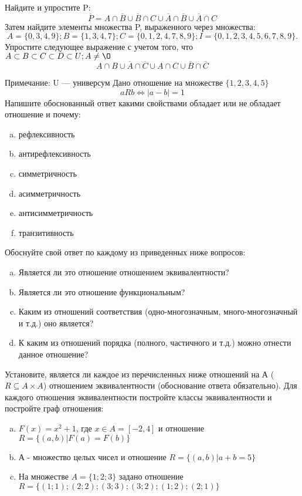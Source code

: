 \documentclass[10pt]{exam}
\begin{document}
\begin{questions}
\question
Найдите и упростите P:
\begin{equation*}
\overline{P} = A \cap \overline{B} \cup \overline{B} \cap C \cup \overline{A} \cap \overline{B} \cup \overline{A} \cap C
\end{equation*}
Затем найдите элементы множества P, выраженного через множества:
\begin{equation*}
A = \{0, 3, 4, 9\}; 
B = \{1, 3, 4, 7\};
C = \{0, 1, 2, 4, 7, 8, 9\};
I = \{0, 1, 2, 3, 4, 5, 6, 7, 8, 9\}.
\end{equation*}\question
Упростите следующее выражение с учетом того, что $A\subset B \subset C \subset D \subset U; A \neq \O$
\begin{equation*}
A \cap B \cup \overline{A} \cap \overline{C} \cup A \cap C \cup \overline{B} \cap \overline{C}
\end{equation*}

Примечание: U — универсум\question
Дано отношение на множестве $\{1, 2, 3, 4, 5\}$ 
\begin{equation*}
aRb \iff |a-b| = 1
\end{equation*}
Напишите обоснованный ответ какими свойствами обладает или не обладает отношение и почему:   
\begin{enumerate} [a)]\setcounter{enumi}{0}
\item рефлексивность
\item антирефлексивность
\item симметричность
\item асимметричность
\item антисимметричность
\item транзитивность
\end{enumerate}

Обоснуйте свой ответ по каждому из приведенных ниже вопросов:
\begin{enumerate} [a)]\setcounter{enumi}{0}
    \item Является ли это отношение отношением эквивалентности?
    \item Является ли это отношение функциональным?
    \item Каким из отношений соответствия (одно-многозначным, много-многозначный и т.д.) оно является?
    \item К каким из отношений порядка (полного, частичного и т.д.) можно отнести данное отношение?
\end{enumerate}

\question
Установите, является ли каждое из перечисленных ниже отношений на А ($R \subseteq A \times A$) отношением эквивалентности (обоснование ответа обязательно). Для каждого отношения эквивалентности постройте классы эквивалентности и постройте граф отношения:
\begin{enumerate} [a)]\setcounter{enumi}{0}
\item $F(x)=x^{2}+1$, где $x \in A = [-2, 4]$ и отношение $R = \{(a,b)|F(a) = F(b)\}$
\item А - множество целых чисел и отношение $R = \{(a,b)|a + b = 5\}$
\item На множестве $A = \{1; 2; 3\}$ задано отношение $R = \{(1; 1); (2; 2); (3; 3); (3; 2); (1; 2); (2; 1)\}$


\end{enumerate}
\end{questions}
\end{document}
